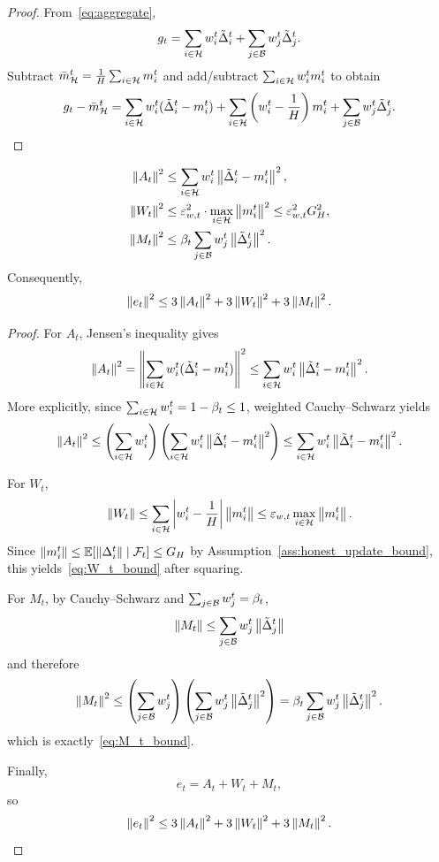 \begin{proof}
From~\eqref{eq:aggregate},
\[
    g_t
    =
    \sum_{i \in \mathcal{H}} w_i^t \tilde{\Delta}_i^t
    +
    \sum_{j \in \mathcal{B}} w_j^t \tilde{\Delta}_j^t.
\]
Subtract \(\bar m_{\mathcal{H}}^t = \frac{1}{H}\sum_{i\in\mathcal{H}}m_i^t\) and
add/subtract \(\sum_{i\in\mathcal{H}} w_i^t m_i^t\) to obtain
\[
    g_t - \bar m_{\mathcal{H}}^t
    =
    \sum_{i \in \mathcal{H}} w_i^t(\tilde{\Delta}_i^t-m_i^t)
    +
    \sum_{i \in \mathcal{H}}
    \left(w_i^t-\frac{1}{H}\right)m_i^t
    +
    \sum_{j \in \mathcal{B}} w_j^t \tilde{\Delta}_j^t.
\]
\end{proof}

\begin{lemma}
\label{lem:term_bounds}
\begin{align}
    \left\lVert A_t \right\rVert^2
    &\le
    \sum_{i \in \mathcal{H}} w_i^t \left\lVert \tilde{\Delta}_i^t-m_i^t \right\rVert^2,
    \label{eq:A_t_bound}\\
    \left\lVert W_t \right\rVert^2
    &\le
    \varepsilon_{w,t}^2 \cdot \max_{i\in\mathcal{H}}\left\lVert m_i^t \right\rVert^2
    \le
    \varepsilon_{w,t}^2 G_H^2,
    \label{eq:W_t_bound}\\
    \left\lVert M_t \right\rVert^2
    &\le
    \beta_t \sum_{j\in\mathcal{B}} w_j^t \left\lVert \tilde{\Delta}_j^t \right\rVert^2.
    \label{eq:M_t_bound}
\end{align}
Consequently,
\begin{equation}
    \left\lVert e_t \right\rVert^2
    \le
    3\left\lVert A_t \right\rVert^2 + 3\left\lVert W_t \right\rVert^2 + 3\left\lVert M_t \right\rVert^2.
    \label{eq:e_abc}
\end{equation}
\end{lemma}

\begin{proof}
For \(A_t\), Jensen's inequality gives
\[
    \left\lVert A_t \right\rVert^2
    =
    \left\|
        \sum_{i \in \mathcal{H}} w_i^t(\tilde{\Delta}_i^t-m_i^t)
    \right\|^2
    \le
    \sum_{i \in \mathcal{H}} w_i^t \left\lVert \tilde{\Delta}_i^t-m_i^t \right\rVert^2.
\]
More explicitly, since \(\sum_{i\in\mathcal{H}} w_i^t = 1-\beta_t \le 1\),
weighted Cauchy--Schwarz yields
\[
    \left\lVert A_t \right\rVert^2
    \le
    \left(\sum_{i\in\mathcal{H}} w_i^t\right)
    \left(\sum_{i\in\mathcal{H}} w_i^t \left\lVert \tilde{\Delta}_i^t-m_i^t \right\rVert^2\right)
    \le
    \sum_{i\in\mathcal{H}} w_i^t \left\lVert \tilde{\Delta}_i^t-m_i^t \right\rVert^2.
\]

For \(W_t\),
\[
    \left\lVert W_t \right\rVert
    \le
    \sum_{i \in \mathcal{H}}
    \left\lvert w_i^t-\frac{1}{H} \right\rvert \left\lVert m_i^t \right\rVert
    \le
    \varepsilon_{w,t} \max_{i\in\mathcal{H}}\left\lVert m_i^t \right\rVert.
\]
Since \(\left\lVert m_i^t \right\rVert\le\mathbb{E}[\left\lVert \Delta_i^t \right\rVert\mid\mathcal{F}_t]\le G_H\) by
Assumption~\ref{ass:honest_update_bound}, this yields~\eqref{eq:W_t_bound}
after squaring.

For \(M_t\), by Cauchy--Schwarz and \(\sum_{j\in\mathcal{B}}w_j^t=\beta_t\),
\[
    \left\lVert M_t \right\rVert
    \le
    \sum_{j\in\mathcal{B}} w_j^t \left\lVert \tilde{\Delta}_j^t \right\rVert
\]
and therefore
\[
    \left\lVert M_t \right\rVert^2
    \le
    \left(\sum_{j\in\mathcal{B}}w_j^t\right)
    \left(\sum_{j\in\mathcal{B}}w_j^t\left\lVert \tilde{\Delta}_j^t \right\rVert^2\right)
    =
    \beta_t\sum_{j\in\mathcal{B}}w_j^t\left\lVert \tilde{\Delta}_j^t \right\rVert^2.
\]
which is exactly~\eqref{eq:M_t_bound}.

Finally,
\[
    e_t = A_t + W_t + M_t,
\]
so
\[
    \left\lVert e_t \right\rVert^2
    \le
    3\left\lVert A_t \right\rVert^2 + 3\left\lVert W_t \right\rVert^2 + 3\left\lVert M_t \right\rVert^2.
\]
\end{proof}


